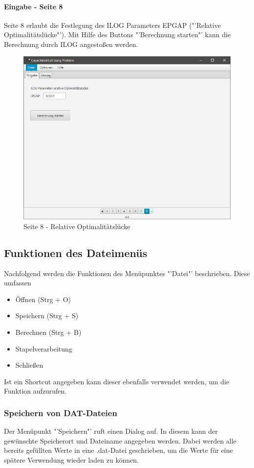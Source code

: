 \documentclass[12pt,a4paper, listof=entryprefix, bibliography=totocnumbered,toc=listofnumbered,lof=listofnumbered]{scrartcl}
\begin{document}
\pagebreak

\paragraph{Eingabe - Seite 8}
Seite 8 erlaubt die Festlegung des ILOG Parameters EPGAP ("'Relative Optimalitätslücke"'). Mit Hilfe des Buttons "'Berechnung starten"' kann die Berechnung durch ILOG angestoßen werden.

\begin{figure}[H]
	\centering
	\includegraphics[width=.8\linewidth]{images/seite8.png} 
	\caption{Seite 8 - Relative Optimalitätslücke}
	\label{fig:seite8}
\end{figure}


\subsection{Funktionen des Dateimenüs}
Nachfolgend werden die Funktionen des Menüpunktes "'Datei"' beschrieben. Diese umfassen

\begin{itemize}
	\item Öffnen (Strg + O)
	\item Speichern (Strg + S)
	\item Berechnen (Strg + B)
	\item Stapelverarbeitung
	\item Schließen
\end{itemize}

Ist ein Shortcut angegeben kann dieser ebenfalls verwendet werden, um die Funktion aufzurufen.

\subsubsection{Speichern von DAT-Dateien}
Der Menüpunkt "'Speichern"' ruft einen Dialog auf. In diesem kann der gewünschte Speicherort und Dateiname angegeben werden. Dabei werden alle bereits gefüllten Werte in eine .dat-Datei geschrieben, um die Werte für eine spätere Verwendung wieder laden zu können.
\end{document}
